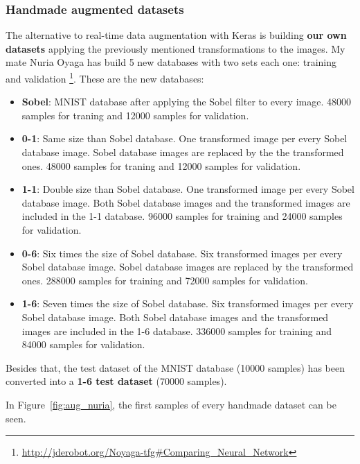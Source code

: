 \subsubsection{Handmade augmented datasets}
The alternative to real-time data augmentation with Keras is building \textbf{our own datasets} applying the previously mentioned transformations to the images. My mate Nuria Oyaga has build 5 new databases with two sets each one: training and validation \footnote{\url{http://jderobot.org/Noyaga-tfg\#Comparing_Neural_Network}}. These are the new databases: 
\begin{itemize}
	\item \textbf{Sobel}: MNIST database after applying the Sobel filter to every image. 48000 samples for traning and 12000 samples for validation. 
	\item \textbf{0-1}: Same size than Sobel database. One transformed image per every Sobel database image. Sobel database images are replaced by the the transformed ones. 48000 samples for traning and 12000 samples for validation. 
	\item \textbf{1-1}: Double size than Sobel database. One transformed image per every Sobel database image. Both Sobel database images and the transformed images are included in the 1-1 database. 96000 samples for training and 24000 samples for validation. 
	\item \textbf{0-6}: Six times the size of Sobel database. Six transformed images per every Sobel database image. Sobel database images are replaced by the transformed ones. 288000 samples for training and 72000 samples for validation. 
	\item \textbf{1-6}: Seven times the size of Sobel database. Six transformed images per every Sobel database image. Both Sobel database images and the transformed images are included in the 1-6 database. 336000 samples for training and 84000 samples for validation. 
\end{itemize}

Besides that, the test dataset of the MNIST database (10000 samples) has been converted into a \textbf{1-6 test dataset} (70000 samples).

In Figure~\ref{fig:aug_nuria}, the first samples of every handmade dataset can be seen.

